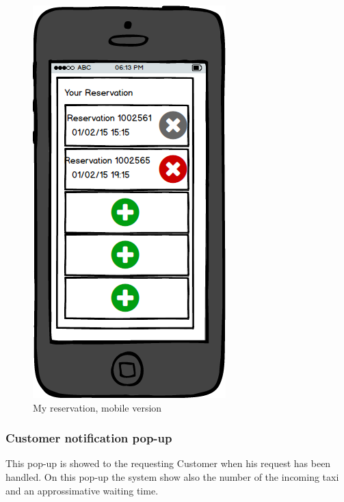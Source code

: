 				\begin{figure}[H]
					\centering
					\includegraphics[scale=0.4]{IMG/UserInterfaces/myReservation_m.png}
					\caption{My reservation, mobile version}\label{myreservation_m}
				\end{figure}
			
			
			\subsubsection{Customer notification pop-up}
			This pop-up is showed to the requesting Customer when his request has been handled. On this pop-up the system show also the number of the incoming taxi and an approssimative waiting time.
			

